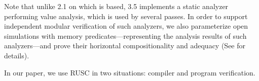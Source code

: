 Note that unlike \cc{} 2.1 on which \ccc{} is based, \cc{} 3.5
implements a static analyzer performing value analysis, which is used by
several passes. In order to support independent modular verification of such analyzers,
we also parameterize open simulations with memory predicates---representing the
analysis results of such analyzers---and
prove their horizontal compositionality and adequacy (See  for details).

 In our paper, we use RUSC
in two situations: compiler and program verification.

